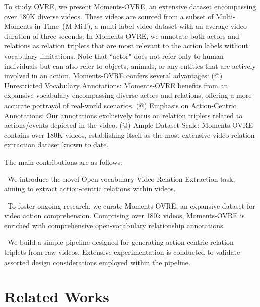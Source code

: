 \documentclass[letterpaper]{article}
\makeatletter
\newcommand{\Rmnum}[1]{\expandafter\@slowromancap\romannumeral #1@}
\makeatother
\begin{document}
To study OVRE, we present Moments-OVRE, an extensive dataset encompassing over 180K diverse videos.
These videos are sourced from a subset of Multi-Moments in Time~\cite{9609554}(M-MiT), a multi-label video dataset with an average video duration of three seconds.
In Moments-OVRE, we annotate both actors and relations as relation triplets that are most relevant to the action labels without vocabulary limitations. Note that ``actor" does not refer only to human individuals but can also refer to objects, animals, or any entities that are actively involved in an action.
Moments-OVRE confers several advantages:
(\Rmnum{1}) Unrestricted Vocabulary Annotations: Moments-OVRE benefits from an expansive vocabulary encompassing diverse actors and relations, offering a more accurate portrayal of real-world scenarios.
(\Rmnum{2}) Emphasis on Action-Centric Annotations: Our annotations exclusively focus on relation triplets related to actions/events depicted in the video.
(\Rmnum{3}) Ample Dataset Scale: Moments-OVRE contains over 180K videos, establishing itself as the most extensive video relation extraction dataset known to date.



The main contributions are as follows:

\textbullet \ We introduce the novel Open-vocabulary Video Relation Extraction task, aiming to extract action-centric relations within videos. %

\textbullet \ To foster ongoing research, we curate Moments-OVRE, an expansive dataset for video action comprehension. Comprising over 180k videos, Moments-OVRE is enriched with comprehensive open-vocabulary relationship annotations.

\textbullet \ We build a simple pipeline designed for generating action-centric relation triplets from raw videos. Extensive experimentation is conducted to validate assorted design considerations employed within the pipeline.


\section{Related Works}
\end{document}
